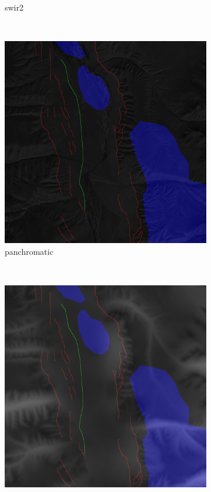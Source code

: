 \documentclass[11pt,a4paper]{article}
\begin{document}
\begin{figure}[t]
\begin{subfigure}[b]{0.18\textwidth}
        \caption{swir2}
        \label{fig:features_swir2}
    \end{subfigure}
    ~
    \begin{subfigure}[b]{0.18\textwidth}
        \includegraphics[width=\textwidth]{graphics/data/0/features_panchromatic.png}
        \caption{panchromatic}
        \label{fig:features_panchromatic}
    \end{subfigure}
    ~
    \begin{subfigure}[b]{0.18\textwidth}
        \includegraphics[width=\textwidth]{graphics/data/0/features_erosion.png}

\end{subfigure}
\end{figure}
\end{document}
